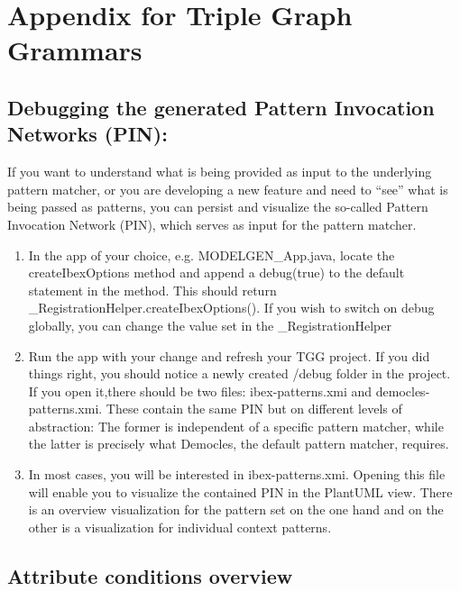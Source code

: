 \section{Appendix for Triple Graph Grammars}

\subsection{Debugging the generated Pattern Invocation Networks (PIN):}

If you want to understand what is being provided as input to the underlying pattern matcher, or you are developing a new feature and need to “see” what is being passed as patterns, you can persist and visualize the so-called Pattern Invocation Network (PIN), which serves as input for the pattern matcher.

\begin{enumerate}

    \item In the app of your choice, e.g. MODELGEN\_App.java, locate the createIbexOptions method and append a debug(true) to the default statement in the method. This should return \_RegistrationHelper.createIbexOptions(). If you wish to switch on debug globally, you can change the value set in the \_RegistrationHelper
    
    \item Run the app with your change and refresh your TGG project. If you did things right, you should notice a newly created /debug folder in the project. If you open it,there should be two files: ibex-patterns.xmi and democles-patterns.xmi. These contain the same PIN but on different levels of abstraction: The former is independent of a specific pattern matcher, while the latter is precisely what Democles, the default pattern matcher, requires.
    
    \item In most cases, you will be interested in ibex-patterns.xmi. Opening this file will enable you to visualize the contained PIN in the PlantUML view. There is an overview visualization for the pattern set on the one hand and on the other is a visualization for individual context patterns.

\end{enumerate}

\clearpage

\subsection{Attribute conditions overview}

